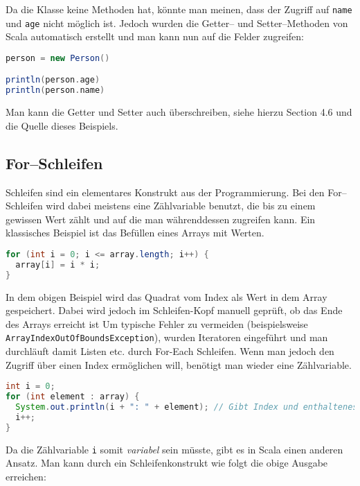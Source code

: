 Da die Klasse keine Methoden hat, könnte man meinen, dass der Zugriff auf \texttt{name} und \texttt{age} nicht möglich ist. Jedoch wurden die Getter-- und Setter--Methoden von Scala automatisch erstellt und man kann nun auf die Felder zugreifen:

\begin{lstlisting}[language=Scala]
person = new Person()

println(person.age)
println(person.name)
\end{lstlisting}

Man kann die Getter und Setter auch überschreiben, siehe hierzu \cite{ScalaCookbook} Section 4.6 und die Quelle dieses Beispiels.

\subsection{For--Schleifen}\label{sec:for-loops}

Schleifen sind ein elementares Konstrukt aus der Programmierung. Bei den For--Schleifen wird dabei meistens eine Zählvariable benutzt, die bis zu einem gewissen Wert zählt und auf die man währenddessen zugreifen kann. Ein klassisches Beispiel ist das Befüllen eines Arrays mit Werten.

\begin{lstlisting}[language=Java,caption=Typische For--Schleife aus der Java Programmierung]
for (int i = 0; i <= array.length; i++) {
  array[i] = i * i;
}
\end{lstlisting}

In dem obigen Beispiel wird das Quadrat vom Index als Wert in dem Array gespeichert. Dabei wird jedoch im Schleifen-Kopf manuell geprüft, ob das Ende des Arrays erreicht ist Um typische Fehler zu vermeiden (beispielsweise \texttt{ArrayIndexOutOfBoundsException}), wurden Iteratoren eingeführt und man durchläuft damit Listen etc. durch For-Each Schleifen. Wenn man jedoch den Zugriff über einen Index ermöglichen will, benötigt man wieder eine Zählvariable.

\begin{lstlisting}[language=Java]
int i = 0;
for (int element : array) {
  System.out.println(i + ": " + element); // Gibt Index und enthaltenes Element aus
  i++;
}
\end{lstlisting}

Da die Zählvariable \texttt{i} somit \textit{variabel} sein müsste, gibt es in Scala einen anderen Ansatz. Man kann durch ein Schleifenkonstrukt wie folgt die obige Ausgabe erreichen:

